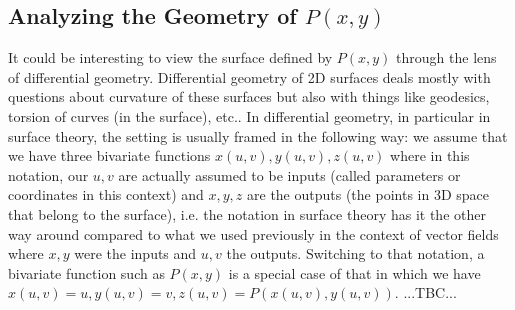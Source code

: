 \documentclass[12pt]{article}
\begin{document}
\subsection{Analyzing the Geometry of $P(x,y)$}
It could be interesting to view the surface defined by $P(x,y)$ through the lens of differential geometry. Differential geometry of 2D surfaces deals mostly with questions about curvature of these surfaces but also with things like geodesics, torsion of curves (in the surface), etc.. In differential geometry, in particular in surface theory, the setting is usually framed in the following way: we assume that we have three bivariate functions $x(u,v), y(u,v), z(u,v)$ where in this notation, our $u,v$ are actually assumed to be inputs (called parameters or coordinates in this context) and $x,y,z$ are the outputs (the points in 3D space that belong to the surface), i.e. the notation in surface theory has it the other way around compared to what we used previously in the context of vector fields where $x,y$ were the inputs and $u,v$ the outputs. Switching to that notation, a bivariate function such as $P(x,y)$ is a special case of that in which we have $x(u,v) = u, y(u,v) = v, z(u,v) = P(x(u,v),y(u,v))$. ...TBC... 


\end{document}
